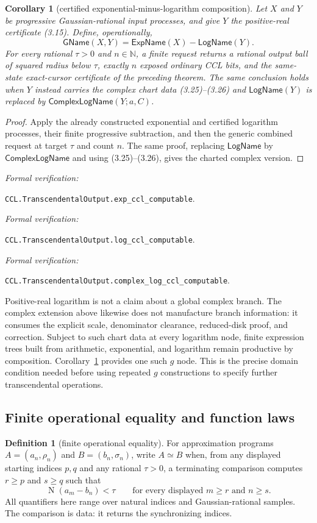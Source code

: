 \documentclass[10pt]{article}
\newtheorem{corollary}[theorem]{Corollary}
\theoremstyle{definition}
\newtheorem{definition}[theorem]{Definition}
\theoremstyle{remark}
\newcommand{\N}{\mathbb{N}}
\newcommand{\Norm}{\operatorname{N}}
\newcommand{\leanref}[1]{\par\smallskip\noindent
  \emph{Formal verification:}\par\nobreak
  {\raggedright\nolinkurl{#1}.\par}}
\begin{document}
\begin{corollary}[certified exponential-minus-logarithm composition]
\label{cor:g-productive}
Let $X$ and $Y$ be progressive Gaussian-rational input processes, and give
$Y$ the positive-real certificate (3.15).  Define, operationally,
\[
 \mathsf{GName}(X,Y)=\mathsf{ExpName}(X)-\mathsf{LogName}(Y).
 \tag{3.27}
\]
For every rational $\tau>0$ and $n\in\N$, a finite request returns a rational
output ball of squared radius below $\tau$, exactly $n$ exposed ordinary CCL
bits, and the same-state exact-cursor certificate of the preceding theorem.
The same conclusion holds when $Y$ instead carries the complex chart data
(3.25)--(3.26) and $\mathsf{LogName}(Y)$ is replaced by
$\mathsf{ComplexLogName}(Y;a,C)$.
\end{corollary}

\begin{proof}
Apply the already constructed exponential and certified logarithm processes,
their finite progressive subtraction, and then the generic combined request
at target $\tau$ and count $n$.
The same proof, replacing $\mathsf{LogName}$ by
$\mathsf{ComplexLogName}$ and using (3.25)--(3.26), gives the charted
complex version.
\end{proof}

\leanref{CCL.TranscendentalOutput.exp_ccl_computable}
\leanref{CCL.TranscendentalOutput.log_ccl_computable}
\leanref{CCL.TranscendentalOutput.complex_log_ccl_computable}

Positive-real logarithm is not a claim about a global complex branch.  The
complex extension above likewise does not manufacture branch information:
it consumes the explicit scale, denominator clearance, reduced-disk proof,
and correction.  Subject to such chart data at every logarithm node, finite
expression trees built from arithmetic, exponential, and logarithm remain
productive by composition.
Corollary~\ref{cor:g-productive} provides one such $g$ node.  This is the
precise domain condition needed before using
repeated $g$ constructions to specify further transcendental operations.

\subsection{Finite operational equality and function laws}

\begin{definition}[finite operational equality]
For approximation programs $A=(a_n,\rho_n)$ and $B=(b_n,\sigma_n)$, write
$A\simeq B$ when, from any displayed starting indices $p,q$ and any rational
$\tau>0$, a terminating comparison computes $r\ge p$ and $s\ge q$ such that
\[
 \Norm(a_m-b_n)<\tau
 \qquad\text{for every displayed }m\ge r\text{ and }n\ge s.
 \tag{3.28}
\]
All quantifiers here range over natural indices and Gaussian-rational
samples.  The comparison is data: it returns the synchronizing indices.
\end{definition}
\end{document}
